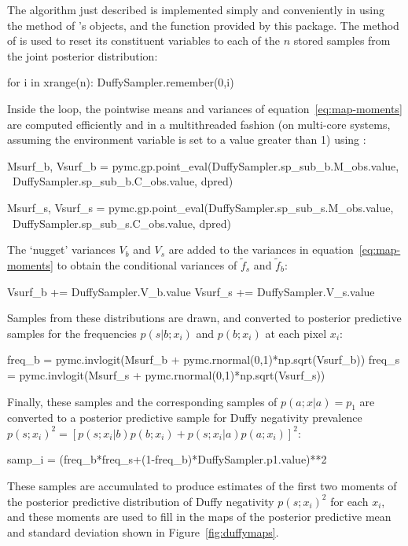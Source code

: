 \documentclass[article]{jss}
\begin{document}
\bigskip
The algorithm just described is implemented simply and conveniently in  using the  method of 's  objects, and the  function provided by this package. The  method of  is used to reset its constituent variables to each of the $n$ stored samples from the joint posterior distribution:
\begin{CodeInput}
for i in xrange(n):
    DuffySampler.remember(0,i)
\end{CodeInput}
Inside the loop, the pointwise means and variances of equation~\ref{eq:map-moments} are computed efficiently and in a multithreaded fashion (on multi-core systems, assuming the environment variable  is set to a value greater than 1) using :
\begin{CodeInput}
    Msurf_b, Vsurf_b = pymc.gp.point_eval(DuffySampler.sp_sub_b.M_obs.value, \
        DuffySampler.sp_sub_b.C_obs.value, dpred)
    
    Msurf_s, Vsurf_s = pymc.gp.point_eval(DuffySampler.sp_sub_s.M_obs.value, \
        DuffySampler.sp_sub_s.C_obs.value, dpred)
\end{CodeInput}
The `nugget' variances $V_b$ and $V_s$ are added to the variances in equation~\ref{eq:map-moments} to obtain the conditional variances of $\tilde f_s$ and $\tilde f_b$:        
\begin{CodeInput} 
    Vsurf_b += DuffySampler.V_b.value
    Vsurf_s += DuffySampler.V_s.value
\end{CodeInput}
 Samples from these distributions are drawn, and converted to posterior predictive samples for the frequencies $p(s|b;x_i)$ and $p(b;x_i)$ at each pixel $x_i$:
\begin{CodeInput}
    freq_b = pymc.invlogit(Msurf_b + pymc.rnormal(0,1)*np.sqrt(Vsurf_b))
    freq_s = pymc.invlogit(Msurf_s + pymc.rnormal(0,1)*np.sqrt(Vsurf_s))
\end{CodeInput}
Finally, these samples and the corresponding samples of $p(a;x|a)=p_1$ are converted to a posterior predictive sample for Duffy negativity prevalence $p(s;x_i)^2=[p(s;x_i|b)p(b;x_i)+p(s;x_i|a)p(a;x_i)]^2$:
\begin{CodeInput}
    samp_i = (freq_b*freq_s+(1-freq_b)*DuffySampler.p1.value)**2
\end{CodeInput}
These samples are accumulated to produce estimates of the first two moments of the posterior predictive distribution of Duffy negativity $p(s;x_i)^2$ for each $x_i$, and these moments are used to fill in the maps of the posterior predictive mean and standard deviation shown in Figure~\ref{fig:duffymaps}.
\end{document}
